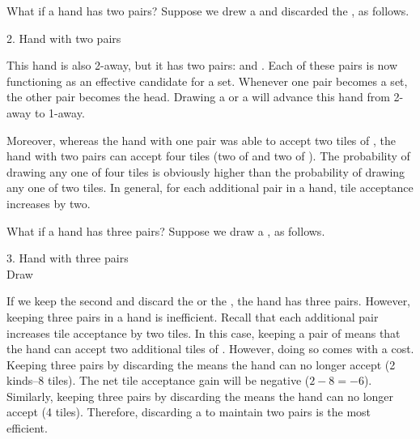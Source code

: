 \bigskip
What if a hand has two pairs? Suppose we drew a {\large{}} and discarded the {\large\bei}, as follows.

\bigskip
\begin{itembox}[r]{2. Hand with two pairs}
\bp
{}
\ep
\end{itembox}
\noindent This hand is also 2-away, but it has two pairs: {\large{}} and {\large{}}. 
Each of these pairs is now functioning as an effective candidate for a set. Whenever one pair becomes a set, the other pair becomes the head. Drawing a {\large{}} or a {\large{}} will advance this hand from 2-away to 1-away. 

\bigskip
Moreover, whereas the hand with one pair was able to accept two tiles of {\large{}}, the hand with two pairs can accept four tiles (two of {\large{}} and two of {\large{}}). The probability of drawing any one of four tiles is obviously higher than the probability of drawing any one of two tiles. 
In general, for each additional pair in a hand, tile acceptance increases by two. 

\bigskip
What if a hand has three pairs? Suppose we draw a {\large{}}, as follows. 

\bigskip
\begin{itembox}[r]{3. Hand with three pairs}
\bp
{}~\\
\hspace{290pt}\footnotesize{Draw}
\ep
\end{itembox}
\noindent If we keep the second {\large{}} and discard the {\large{}} or the {\large{}}, the hand has three pairs. However, keeping three pairs in a hand is inefficient. Recall that each additional pair increases tile acceptance by two tiles. In this case, keeping a pair of {\large{}} means that the hand can accept two additional tiles of {\large{}}. However, doing so comes with a cost. Keeping three pairs by discarding the {\large{}} means the hand can no longer accept {\large{} } (2 kinds--8 tiles). The net tile acceptance gain will be negative ($2-8 = -6$). Similarly, keeping three pairs by discarding the {\large{}} means the hand can no longer accept {\large{}} (4 tiles). 
Therefore, discarding a {\large{}} to maintain two pairs is the most efficient. 

